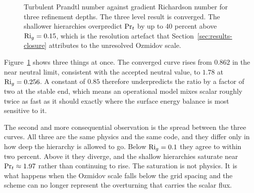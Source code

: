 \begin{figure}[t]
\centering
{}
\caption[Turbulent Prandtl number against gradient Richardson number]{Turbulent
Prandtl number against gradient Richardson number for three refinement depths.
The three level result is converged. The shallower hierarchies overpredict
$\mathrm{Pr}_t$ by up to 40 percent above $\mathrm{Ri}_g = 0.15$, which is the resolution
artefact that Section~\ref{sec:results-closure} attributes to the unresolved
Ozmidov scale.}
\label{fig:prandtl}
\end{figure}

Figure~\ref{fig:prandtl} shows three things at once. The converged curve rises
from $0.862$ in the near neutral limit, consistent with the accepted neutral
value, to $1.78$ at $\mathrm{Ri}_g = 0.256$. A constant of $0.85$ therefore
underpredicts the ratio by a factor of two at the stable end, which means an
operational model mixes scalar roughly twice as fast as it should exactly where
the surface energy balance is most sensitive to it.

The second and more consequential observation is the spread between the three
curves. All three are the same physics and the same code, and they differ only
in how deep the hierarchy is allowed to go. Below $\mathrm{Ri}_g = 0.1$ they agree to
within two percent. Above it they diverge, and the shallow hierarchies saturate
near $\mathrm{Pr}_t \approx 1.97$ rather than continuing to rise. The saturation is
not physics. It is what happens when the Ozmidov scale falls below the grid
spacing and the scheme can no longer represent the overturning that carries the
scalar flux.

